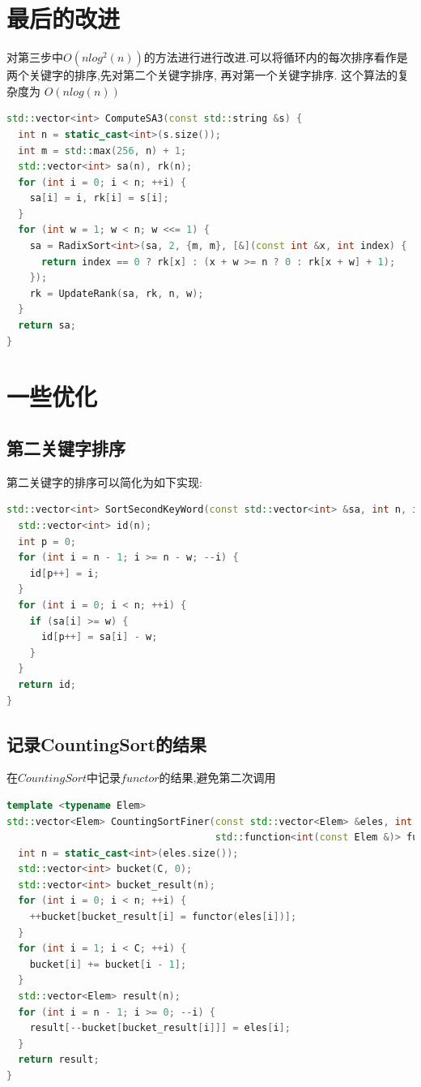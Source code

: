 \documentclass{article}
\begin{document}
\section{最后的改进}
对第三步中$O(nlog^{2}(n))$的方法进行进行改进.可以将循环内的每次排序看作是两个关键字的排序,先对第二个关键字排序, 再对第一个关键字排序. 这个算法的复杂度为 $O(nlog(n))$\par
\begin{lstlisting}[language=C++, caption={Last Improvement}]
std::vector<int> ComputeSA3(const std::string &s) {
  int n = static_cast<int>(s.size());
  int m = std::max(256, n) + 1;
  std::vector<int> sa(n), rk(n);
  for (int i = 0; i < n; ++i) {
    sa[i] = i, rk[i] = s[i];
  }
  for (int w = 1; w < n; w <<= 1) {
    sa = RadixSort<int>(sa, 2, {m, m}, [&](const int &x, int index) {
      return index == 0 ? rk[x] : (x + w >= n ? 0 : rk[x + w] + 1);
    });
    rk = UpdateRank(sa, rk, n, w);
  }
  return sa;
}
\end{lstlisting}

\section{一些优化}
\subsection{第二关键字排序}
第二关键字的排序可以简化为如下实现: \par
\begin{lstlisting}[language=C++, caption={Second Key Sort}]
std::vector<int> SortSecondKeyWord(const std::vector<int> &sa, int n, int w) {
  std::vector<int> id(n);
  int p = 0;
  for (int i = n - 1; i >= n - w; --i) {
    id[p++] = i;
  }
  for (int i = 0; i < n; ++i) {
    if (sa[i] >= w) {
      id[p++] = sa[i] - w;
    }
  }
  return id;
}
\end{lstlisting}
\subsection{记录CountingSort的结果}
在$CountingSort$中记录$functor$的结果,避免第二次调用
\begin{lstlisting}[language=C++, caption={CountingSortFiner}]
template <typename Elem>
std::vector<Elem> CountingSortFiner(const std::vector<Elem> &eles, int C,
                                    std::function<int(const Elem &)> functor) {
  int n = static_cast<int>(eles.size());
  std::vector<int> bucket(C, 0);
  std::vector<int> bucket_result(n);
  for (int i = 0; i < n; ++i) {
    ++bucket[bucket_result[i] = functor(eles[i])];
  }
  for (int i = 1; i < C; ++i) {
    bucket[i] += bucket[i - 1];
  }
  std::vector<Elem> result(n);
  for (int i = n - 1; i >= 0; --i) {
    result[--bucket[bucket_result[i]]] = eles[i];
  }
  return result;
}

\end{lstlisting}
\end{document}
